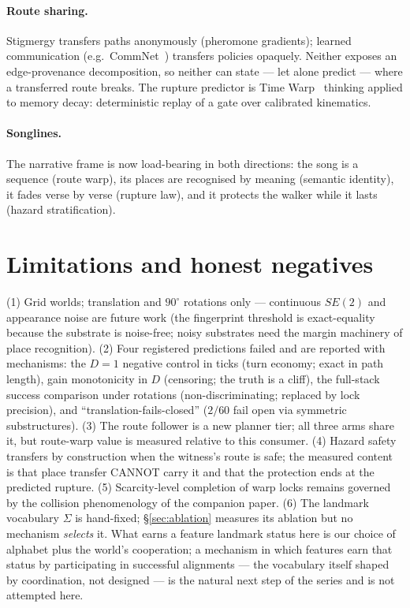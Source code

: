 \documentclass{article}
\begin{document}
\paragraph{Route sharing.} Stigmergy transfers paths anonymously
(pheromone gradients); learned communication (e.g.\
CommNet~\cite{sukhbaatar2016commnet}) transfers policies opaquely.
Neither exposes an edge-provenance decomposition, so neither can
state --- let alone predict --- where a transferred route breaks.
The rupture predictor is Time Warp~\cite{jefferson1985} thinking
applied to memory decay: deterministic replay of a gate over
calibrated kinematics.
\paragraph{Songlines.} The narrative frame is now load-bearing in
both directions: the song is a sequence (route warp), its places are
recognised by meaning (semantic identity), it fades verse by verse
(rupture law), and it protects the walker while it lasts (hazard
stratification). %

\section{Limitations and honest negatives}
\label{sec:limits}

(1) Grid worlds; translation and $90^\circ$ rotations only ---
continuous $SE(2)$ and appearance noise are future work (the
fingerprint threshold is exact-equality because the substrate is
noise-free; noisy substrates need the margin machinery of place
recognition). (2) Four registered predictions failed and are reported
with mechanisms: the $D{=}1$ negative control in ticks (turn economy;
exact in path length), gain monotonicity in $D$ (censoring; the truth
is a cliff), the full-stack success comparison under rotations
(non-discriminating; replaced by lock precision), and
``translation-fails-closed'' ($2/60$ fail open via symmetric
substructures). (3) The route follower is a new planner tier; all
three arms share it, but route-warp value is measured relative to
this consumer. (4) Hazard safety transfers by construction when the
witness's route is safe; the measured content is that place transfer
CANNOT carry it and that the protection ends at the predicted
rupture. (5) Scarcity-level completion of warp locks remains governed
by the collision phenomenology of the companion paper. (6) The
landmark vocabulary $\Sigma$ is hand-fixed; \S\ref{sec:ablation}
measures its ablation but no mechanism \emph{selects} it. What earns a
feature landmark status here is our choice of alphabet plus the
world's cooperation; a mechanism in which features earn that status by
participating in successful alignments --- the vocabulary itself
shaped by coordination, not designed --- is the natural next step of
the series and is not attempted here.
\end{document}
